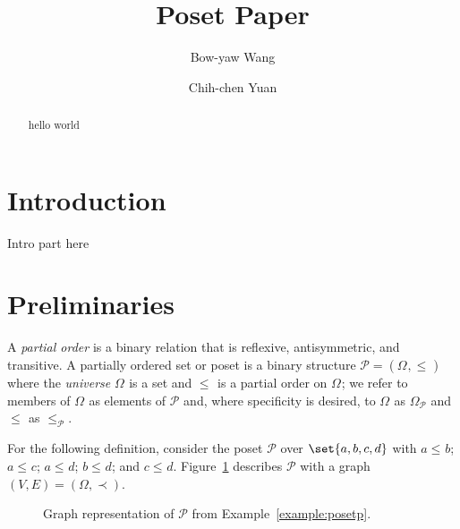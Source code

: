 \documentclass[12pt]{llncs}
\DeclarePairedDelimiter\set\{\}
\let\oldleq\leq
\let\covered\prec
\renewcommand{\leq}[1][]{\oldleq_{#1}}
\newcommand{\poset}[1]{\mathcal{#1}}
\newcommand{\uni}[1][]{\Omega_{#1}}
\begin{document}
\title{Poset Paper}
\author{Bow-yaw Wang \and Chih-chen Yuan}
\maketitle

\begin{abstract}
hello world
\end{abstract}

\section{Introduction}
Intro part here

\section{Preliminaries}
A \emph{partial order} is a binary relation that is reflexive, antisymmetric, and transitive. A partially ordered set or poset is a binary structure $\poset{P} = (\uni, \leq)$ where the \emph{universe} $\uni$ is a set and $\leq$ is a partial order on $\uni$; we refer to members of $\uni$ as elements of $\poset{P}$ and, where specificity is desired, to $\uni$ as $\uni[
\poset{P}]$ and $\leq$ as $\leq[\poset{P}]$.

\begin{example}
    For the following definition, consider the poset $\poset{P}$ over $\set{a,b,c,d}$ with $a \leq b$; $a \leq c$; $a \leq d$; $b \leq d$; and $c \leq d$. Figure~\ref{figure:posetp} describes $\poset{P}$ with a graph $(V,E) = (\Omega,\covered)$.
    \label{example:posetp}
\end{example}

\begin{figure}
    \centering
    \caption{Graph representation of $\poset{P}$ from Example~\ref{example:posetp}.}
    \label{figure:posetp}
\end{figure}
\end{document}
